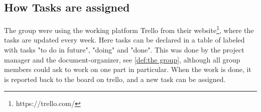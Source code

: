 \subsection {How Tasks are assigned}
The group were using the working platform Trello from their website\footnote{https://trello.com/}, where the tasks are updated every week. Here tasks can be declared in a table of labeled with tasks "to do in future", "doing" and "done". This was done by the project manager and the document-organizer, see \ref{def:the group}, although all group members could ask to work on one part in particular. When the work is done, it is reported back to the board on trello, and a new task can be assigned.  
